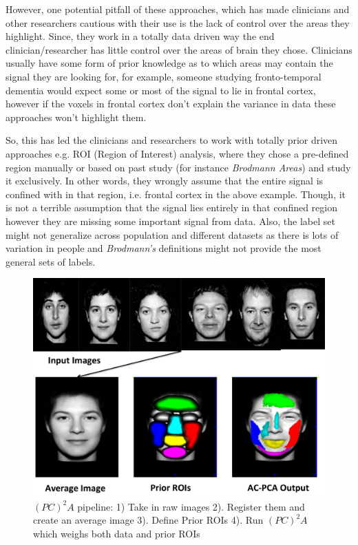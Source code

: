 \documentclass{llncs}
\begin{document}
However, one potential pitfall of these approaches, which has made clinicians and other researchers cautious with their use is the lack of control over the areas they highlight. Since, they work in a totally data driven way the end clinician/researcher has little control over the areas of brain they chose. Clinicians usually have some form of prior knowledge as to which areas may contain the signal they are looking for, for example, someone studying fronto-temporal dementia would expect some or most of the signal to lie in frontal cortex, however if the voxels in frontal cortex don't explain the variance in data these approaches won't highlight them. 

So, this has led the clinicians and researchers to work with totally prior driven approaches e.g. ROI (Region of Interest) analysis, where they chose a pre-defined region manually or based on past study (for instance {\em Brodmann Areas}) and study it exclusively. In other words, they wrongly assume that the entire signal is confined with in that region, i.e. frontal cortex in the above example. Though, it is not a terrible assumption that the signal lies entirely in that confined region however they are missing some important signal from data. Also, the label set might not generalize across population and different datasets as there is lots of variation in people and {\it Brodmann's} definitions might not provide the most general sets of labels.

\begin{figure}
\begin{center}
\includegraphics[width=0.7\linewidth]{fig1.pdf} 
\end{center}
\vspace{-0.2in}
\caption{$(PC)^2A$ pipeline: 1) Take in raw images 2). Register them and create an average image 3). Define Prior ROIs 4). Run $(PC)^2A$ which weighs both data and prior ROIs }
\label{fig:faces}
\end{figure}
\end{document}
